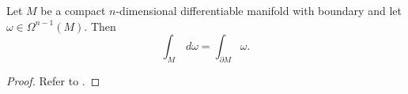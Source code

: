 \begin{theorem}
Let $M$ be a compact $n$-dimensional differentiable manifold with boundary and let $\omega\in\Omega^{n-1}(M)$. Then
\[
\int_M\,d\omega=\int_{\partial M}\omega.
\]
\label{thm:stokes}
\end{theorem}
\begin{proof}
Refer to \cite{andrews}.
\end{proof}
